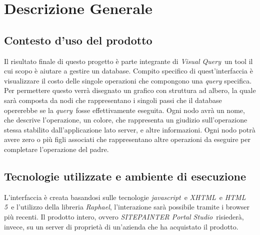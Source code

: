 \section{Descrizione Generale}
\subsection{Contesto d'uso del prodotto}
Il risultato finale di questo progetto è parte integrante di \textit{Visual Query}\ un tool il cui scopo è aiutare a gestire un database. Compito specifico di quest'interfaccia è visualizzare il costo delle singole operazioni che compongono una \textit{query} specifica. Per permettere questo verrà disegnato un grafico con struttura ad albero, la quale sarà composta da nodi che rappresentano i singoli passi che il database opererebbe se la \textit{query}\ fosse effettivamente eseguita. Ogni nodo avrà un nome, che descrive l'operazione, un colore, che rappresenta un giudizio sull'operazione stessa stabilito dall'applicazione lato server, e altre informazioni. Ogni nodo potrà avere zero o più figli associati che rappresentano altre operazioni da eseguire per completare l'operazione del padre.
\subsection{Tecnologie utilizzate e ambiente di esecuzione}
L'interfaccia è creata basandosi sulle tecnologie \textit{javascript}\ e \textit{XHTML}\ e \textit{HTML 5}\ e l'utilizzo della libreria \textit{Raphael}, l'interazione sarà possibile tramite i browser più recenti. Il prodotto intero, ovvero  \textit{SITEPAINTER Portal Studio}\ risiederà, invece, su un server di proprietà di un'azienda che ha acquistato il prodotto.
